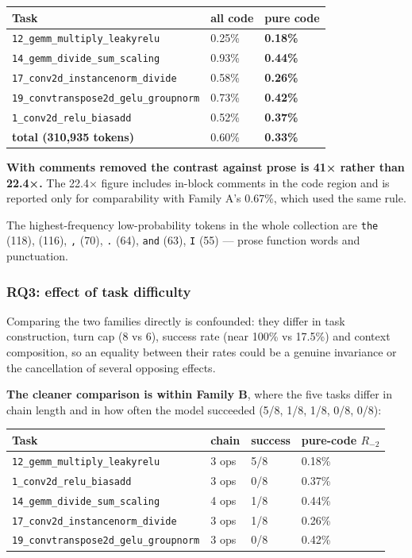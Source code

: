 \documentclass[
  11pt,
]{article}
\begin{document}
\begin{longtable}[]{@{}lll@{}}
\toprule
Task & all code & pure code \\
\midrule
\endhead
\texttt{12\_gemm\_multiply\_leakyrelu} & 0.25\% & \textbf{0.18\%} \\
\texttt{14\_gemm\_divide\_sum\_scaling} & 0.93\% & \textbf{0.44\%} \\
\texttt{17\_conv2d\_instancenorm\_divide} & 0.58\% & \textbf{0.26\%} \\
\texttt{19\_convtranspose2d\_gelu\_groupnorm} & 0.73\% &
\textbf{0.42\%} \\
\texttt{1\_conv2d\_relu\_biasadd} & 0.52\% & \textbf{0.37\%} \\
\textbf{total (310,935 tokens)} & 0.60\% & \textbf{0.33\%} \\
\bottomrule
\end{longtable}

\textbf{With comments removed the contrast against prose is 41× rather
than 22.4×.} The 22.4× figure includes in-block comments in the code
region and is reported only for comparability with Family A's 0.67\%,
which used the same rule.

The highest-frequency low-probability tokens in the whole collection are
\texttt{the} (118), \texttt{\textasciigrave{}} (116), \texttt{,} (70),
\texttt{.} (64), \texttt{and} (63), \texttt{I} (55) --- prose function
words and punctuation.

\hypertarget{rq3-effect-of-task-difficulty}{%
\subsubsection{RQ3: effect of task
difficulty}\label{rq3-effect-of-task-difficulty}}

Comparing the two families directly is confounded: they differ in task
construction, turn cap (8 vs 6), success rate (near 100\% vs 17.5\%) and
context composition, so an equality between their rates could be a
genuine invariance or the cancellation of several opposing effects.

\textbf{The cleaner comparison is within Family B}, where the five tasks
differ in chain length and in how often the model succeeded (5/8, 1/8,
1/8, 0/8, 0/8):

\begin{longtable}[]{@{}llll@{}}
\toprule
Task & chain & success & pure-code \(R_{-2}\) \\
\midrule
\endhead
\texttt{12\_gemm\_multiply\_leakyrelu} & 3 ops & 5/8 & 0.18\% \\
\texttt{1\_conv2d\_relu\_biasadd} & 3 ops & 0/8 & 0.37\% \\
\texttt{14\_gemm\_divide\_sum\_scaling} & 4 ops & 1/8 & 0.44\% \\
\texttt{17\_conv2d\_instancenorm\_divide} & 3 ops & 1/8 & 0.26\% \\
\texttt{19\_convtranspose2d\_gelu\_groupnorm} & 3 ops & 0/8 & 0.42\% \\
\bottomrule
\end{longtable}
\end{document}
